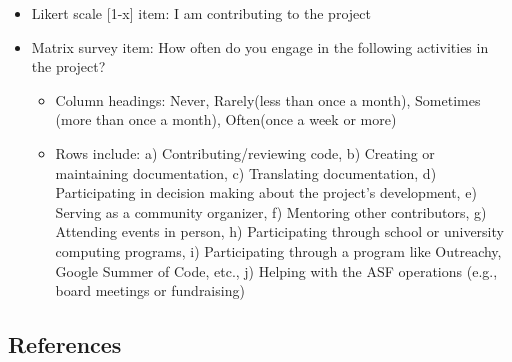 \begin{itemize}
\tightlist
\item
  Likert scale {[}1-x{]} item: I am contributing to the project
\item
  Matrix survey item: How often do you engage in the following
  activities in the project?

  \begin{itemize}
  \tightlist
  \item
    Column headings: Never, Rarely(less than once a month), Sometimes
    (more than once a month), Often(once a week or more)
  \item
    Rows include: a) Contributing/reviewing code, b) Creating or
    maintaining documentation, c) Translating documentation, d)
    Participating in decision making about the project's development, e)
    Serving as a community organizer, f) Mentoring other contributors,
    g) Attending events in person, h) Participating through school or
    university computing programs, i) Participating through a program
    like Outreachy, Google Summer of Code, etc., j) Helping with the ASF
    operations (e.g., board meetings or fundraising)
  \end{itemize}
\end{itemize}

\hypertarget{references}{%
\subsection{References}\label{references}}
